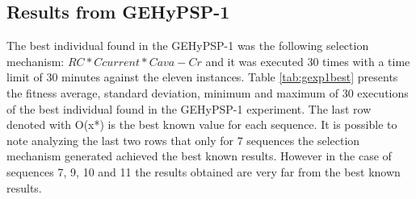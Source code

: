 \documentclass[conference]{IEEEtran}
\begin{document}





\subsection{Results from GEHyPSP-1}

The best individual found in the GEHyPSP-1 was the following selection mechanism:  $RC * Ccurrent * Cava - Cr$ and it was executed 30 times with a time limit of 30 minutes against the eleven instances. Table \ref{tab:gexp1best}  presents the fitness average, standard deviation, minimum and maximum of 30 executions of the best individual found in the GEHyPSP-1 experiment. The last row denoted with O(x*) is the best known value for each sequence. It is possible to note analyzing the last two rows that only for 7 sequences the selection mechanism generated achieved the best known  results. However in the case of sequences 7, 9, 10 and 11 the results obtained are very far from the best known results.
\end{document}
